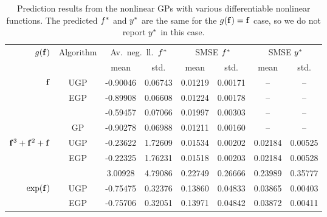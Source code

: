 \documentclass{article} %
\begin{document}
\begin{table}[tb]
    \centering
    \caption[]{Prediction results from the nonlinear GPs with various 
        differentiable nonlinear functions. The predicted $f^{*}$ and 
        $y^{*}$ are the same for the $g\!\left({{\mathbf{f}}}\right) = \mathbf{f}$ case, so
        we do not report $y^{*}$ in this case.}
    \footnotesize
    \begin{tabular}{r|c| c c c c c c}
        \multirow{2}{*}{$g\!\left({{\mathbf{f}}}\right)$} & \multirow{2}{*}{Algorithm} & 
            \multicolumn{2}{c}{Av.\ neg.\ ll.\ $f^{*}$} &
            \multicolumn{2}{c}{SMSE $f^{*}$} &
            \multicolumn{2}{c}{SMSE $y^{*}$} \\
        & & mean & std. & mean & std. & mean & std.\\
        \toprule
        $\mathbf{f}$ 
& UGP & -0.90046 & 0.06743 & 0.01219 & 0.00171 & -- & -- \\
& EGP & -0.89908 & 0.06608 & 0.01224 & 0.00178 & -- & -- \\
& \cite{Opper2009} & -0.59457 & 0.07066 & 0.01997 & 0.00303 & -- & --\\
& GP & -0.90278 & 0.06988 & 0.01211 & 0.00160 & -- & -- \\
        \midrule
        $\mathbf{f}^3 + \mathbf{f}^2 + \mathbf{f}$ 
& UGP & -0.23622 & 1.72609 & 0.01534 & 0.00202 & 0.02184 & 0.00525 \\
& EGP & -0.22325 & 1.76231 & 0.01518 & 0.00203 & 0.02184 & 0.00528 \\
& \cite{Opper2009} & 3.00928 & 4.79086 & 0.22749 & 0.26666 & 0.23989 & 0.35777 \\
        \midrule
        $\exp\!\left({\mathbf{f}}\right)$ 
& UGP & -0.75475 & 0.32376 & 0.13860 & 0.04833 & 0.03865 & 0.00403 \\
& EGP & -0.75706 & 0.32051 & 0.13971 & 0.04842 & 0.03872 & 0.00411 \\

\end{tabular}
\end{table}
\end{document}
